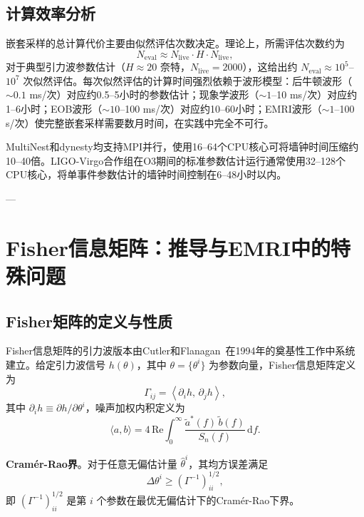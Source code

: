 \section{计算效率分析}

嵌套采样的总计算代价主要由似然评估次数决定。理论上，所需评估次数约为
\begin{equation}
  N_\mathrm{eval} \approx N_\mathrm{live} \cdot H \cdot N_\mathrm{live},
\end{equation}
对于典型引力波参数估计（$H \approx 20$ 奈特，$N_\mathrm{live} = 2000$），这给出约 $N_\mathrm{eval} \approx 10^5$--$10^7$ 次似然评估。每次似然评估的计算时间强烈依赖于波形模型：后牛顿波形（$\sim0.1$ ms/次）对应约0.5--5小时的参数估计；现象学波形（$\sim1$--10 ms/次）对应约1--6小时；EOB波形（$\sim10$--100 ms/次）对应约10--60小时；EMRI波形（$\sim1$--100 s/次）使完整嵌套采样需要数月时间，在实践中完全不可行。

MultiNest和dynesty均支持MPI并行，使用16--64个CPU核心可将墙钟时间压缩约10--40倍。LIGO-Virgo合作组在O3期间的标准参数估计运行通常使用32--128个CPU核心，将单事件参数估计的墙钟时间控制在6--48小时以内。

---

\chapter{Fisher信息矩阵：推导与EMRI中的特殊问题}
\label{app:fisher_matrix}

\section{Fisher矩阵的定义与性质}

Fisher信息矩阵的引力波版本由Cutler和Flanagan~\cite{Cutler1994PE}在1994年的奠基性工作中系统建立。给定引力波信号 $h(\theta)$，其中 $\theta = \{\theta^i\}$ 为参数向量，Fisher信息矩阵定义为
\begin{equation}
  \Gamma_{ij} = \left\langle \partial_i h,\, \partial_j h \right\rangle,
  \label{eq:fisher_def_app}
\end{equation}
其中 $\partial_i h \equiv \partial h / \partial\theta^i$，噪声加权内积定义为
\begin{equation}
  \langle a, b \rangle = 4\,\mathrm{Re}\int_0^\infty \frac{\tilde{a}^*(f)\,\tilde{b}(f)}{S_n(f)}\,\mathrm{d}f.
\end{equation}

\textbf{Cramér-Rao界}。对于任意无偏估计量 $\hat{\theta}^i$，其均方误差满足
\begin{equation}
  \Delta\theta^i \geq \left(\Gamma^{-1}\right)_{ii}^{1/2},
  \label{eq:crb_app}
\end{equation}
即 $(\Gamma^{-1})_{ii}^{1/2}$ 是第 $i$ 个参数在最优无偏估计下的Cramér-Rao下界。

